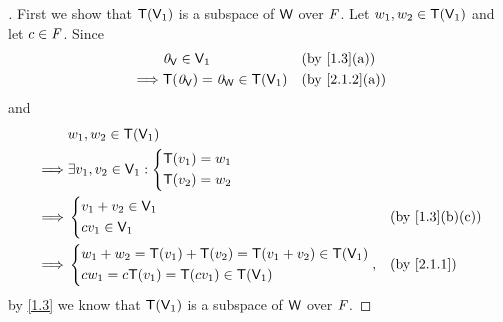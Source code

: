 \begin{proof}[]
	First we show that \(\mathsf{T}(\mathsf{V}_1)\) is a subspace of \(\mathsf{W}\) over \(\mathit{F}\).
	Let \(w_1, w_2 \in \mathsf{T}(\mathsf{V}_1)\) and let \(c \in \mathit{F}\).
	Since
	\begin{align*}
		         & \zv_{\V} \in \V_1                    &  & \by{1.3}[a]   \\
		\implies & \T(\zv_{\V}) = \zv_{\W} \in \T(\V_1) &  & \by{2.1.2}[a]
	\end{align*}
	and
	\begin{align*}
		         & w_1, w_2 \in \T(\V_1)                                                   \\
		\implies & \exists v_1, v_2 \in \V_1 : \begin{dcases}
			                                       \T(v_1) = w_1 \\
			                                       \T(v_2) = w_2
		                                       \end{dcases}                               \\
		\implies & \begin{dcases}
			           v_1 + v_2 \in \V_1 \\
			           c v_1 \in \V_1
		           \end{dcases}                                         &  & \by{1.3}[b,c] \\
		\implies & \begin{dcases}
			           w_1 + w_2 = \T(v_1) + \T(v_2) = \T(v_1 + v_2) \in \T(\V_1) \\
			           c w_1 = c \T(v_1) = \T(c v_1) \in \T(\V_1)
		           \end{dcases}, &  & \by{2.1.1}
	\end{align*}
	by \cref{1.3} we know that \(\mathsf{T}(\mathsf{V}_1)\) is a subspace of \(\mathsf{W}\) over \(\mathit{F}\).


\end{proof}
